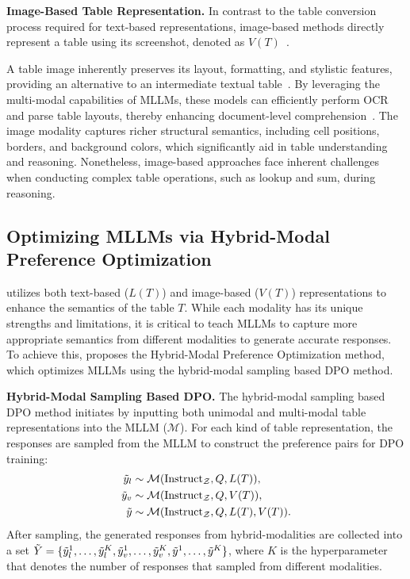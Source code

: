 \textbf{Image-Based Table Representation.} In contrast to the table conversion process required for text-based representations, image-based methods directly represent a table using its screenshot, denoted as $V(T)$~\cite{ZhengFSS0J024}.


A table image inherently preserves its layout, formatting, and stylistic features, providing an alternative to an intermediate textual table~\cite{sui2024table}. By leveraging the multi-modal capabilities of MLLMs, these models can efficiently perform OCR and parse table layouts, thereby enhancing document-level comprehension~\cite{luo2024layoutllm,yu2025visrag}. The image modality captures richer structural semantics, including cell positions, borders, and background colors, which significantly aid in table understanding and reasoning. Nonetheless, image-based approaches face inherent challenges when conducting complex table operations, such as lookup and sum, during reasoning.



\subsection{Optimizing MLLMs via Hybrid-Modal Preference Optimization}\label{sec:preference}
\method{} utilizes both text-based ($L(T)$) and image-based ($V(T)$) representations to enhance the semantics of the table $T$. While each modality has its unique strengths and limitations, it is critical to teach MLLMs to capture more appropriate semantics from different modalities to generate accurate responses. To achieve this, \method{} proposes the Hybrid-Modal Preference Optimization method, which optimizes MLLMs using the hybrid-modal sampling based DPO method.

\textbf{Hybrid-Modal Sampling Based DPO.} The hybrid-modal sampling based DPO method initiates by inputting both unimodal and multi-modal table representations into the MLLM ($\mathcal{M}$). For each kind of table representation, the responses are sampled from the MLLM to construct the preference pairs for DPO training:
\begin{equation}\label{eq:multimodal}
 \begin{aligned}
 \Tilde{y}_l &\sim \mathcal{M} (\text{Instruct}_\mathcal{Z}, Q, L(T)),\\
 \Tilde{y}_v &\sim \mathcal{M} (\text{Instruct}_\mathcal{Z}, Q, V(T)),\\
 \Tilde{y} &\sim \mathcal{M} (\text{Instruct}_\mathcal{Z}, Q, L(T), V(T)).
 \end{aligned}
\end{equation}
After sampling, the generated responses from hybrid-modalities are collected into a set $\Tilde{Y} = \{\Tilde{y}_l^1,\dots,\Tilde{y}_l^K,\Tilde{y}_v^1,\dots,\Tilde{y}_v^K, \Tilde{y}^1,\dots,\Tilde{y}^K\}$, where $K$ is the hyperparameter that denotes the number of responses that sampled from different modalities. 


